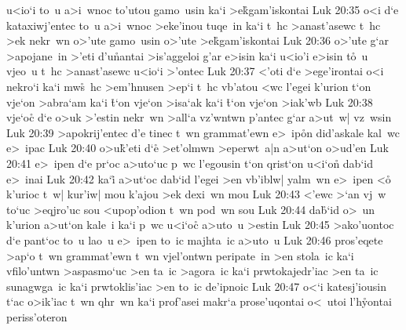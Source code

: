 u<io`i
to~u
a>i~wnoc
to'utou
gamo~usin
ka`i
>e\r{k}gam'iskontai\bibvsend
{}
\vs Luk 20:35
o<i
d`e
kataxiwj'entec
to~u
a>i~wnoc
>eke'inou
tuqe~in
ka`i
t~hc
>anast'asewc
t~hc
>ek
nekr~wn
o>'ute
gamo~usin
o>'ute
>e\r{k}gam'iskontai\bibvsend
{}
\vs Luk 20:36
o>'u\r{t}e
g`ar
>apojane~in
>'eti
d'u\r{n}antai
>is'aggeloi
g'ar
e>isin
ka`i
u<io'i
e>isin
t\r{o}~u
vjeo~u
t~hc
>anast'asewc
u<io`i
>'ontec\bibvsend
\vs Luk 20:37
<'oti
d`e
>ege'irontai
o<i
nekro`i
ka`i
mw\r{s}~hc
>em'hnusen
>ep`i
t~hc
vb'atou
<wc
l'egei
k'urion
t`on
vje`on
>abra`am
ka`i
\r{t}`on
vje`on
>isa`ak
ka`i
\r{t}`on
vje`on
>iak'wb\bibvsend
\vs Luk 20:38
vje`oc\r{}
d`e
o>uk
>'estin
nekr~wn
>all`a
vz'wntwn
p'antec
g`ar
a>ut~w|
vz~wsin\bibvsend
\vs Luk 20:39
>apokrij'entec
d'e
tinec
t~wn
grammat'ewn
e>~ip\r{o}n
did'askale
kal~wc
e>~ipac\bibvsend
\vs Luk 20:40
o>u\r{k}'eti
d`e\r{}
>et'olmwn
>eperwt~a|n
a>ut`on
o>ud'en\bibvsend
\vs Luk 20:41
e>~ipen
d`e
pr`oc
a>uto`uc
p~wc
l'egousin
t`on
qrist`on
u<i`on\r{}
dab`id
e>~inai\bibvsend
\vs Luk 20:42
ka`i\r{}
a>ut`oc
dab`id
l'egei
>en
vb'iblw|
yalm~wn
e>~ipen
<o\r{}
k'urioc
t~w|
kur'iw|
mou
k'ajou
>ek
dexi~wn
mou\bibvsend
\vs Luk 20:43
<'ewc
>`an
vj~w
to`uc
>eqjro'uc
sou
<upop'odion
t~wn
pod~wn
sou\bibvsend
\vs Luk 20:44
da\r{b}`id
o>~un
k'urion
a>ut`on
kale~i
ka`i
p~wc
u<i`oc\r{}
a>uto~u
>estin\bibvsend
\vs Luk 20:45
>ako'uontoc
d`e
pant`oc
to~u
lao~u
e>~ipen
to~ic
majhta~ic
a>uto~u\bibvsend
\vs Luk 20:46
pros'eqete
>ap`o
t~wn
grammat'ewn
t~wn
vjel'ontwn
peripate~in
>en
stola~ic
ka`i
vfilo'untwn
>aspasmo`uc
>en
ta~ic
>agora~ic
ka`i
prwtokajedr'iac
>en
ta~ic
sunagwga~ic
ka`i
prwtoklis'iac
>en
to~ic
de'ipnoic\bibvsend
\vs Luk 20:47
o<`i
katesj'iousin
t`ac
o>ik'iac
t~wn
qhr~wn
ka`i
prof'asei
makr`a
prose'uqontai
o<~utoi
l'h\r{y}ontai
periss'oteron
